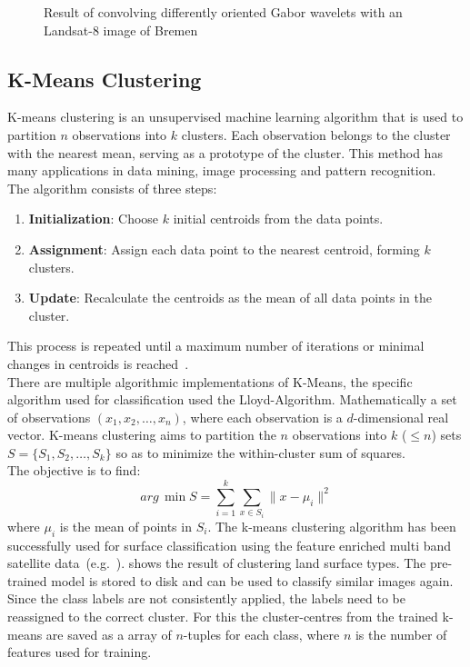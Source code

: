 \documentclass[12pt,a4paper, english,twoside]{scrartcl}
\begin{document}
\begin{figure}[!htbp]
\begin{subfigure}[b]{0.45\textwidth}
           \label{fig:feat06}
       \end{subfigure}
          \caption{Result of convolving differently oriented Gabor wavelets with an Landsat-8 image of Bremen}\label{fig:gaborExample}
      \end{figure}
      \newpage
      \subsection{K-Means Clustering}\label{sec:kmeans}
    K-means clustering is an unsupervised machine learning algorithm that is used to partition $n$ observations into $k$ clusters. 
    Each observation belongs to the cluster with the nearest mean, serving as a prototype of the cluster. 
    This method has many applications in data mining, image processing and pattern recognition.\\
    The algorithm consists of three steps:
    \begin{enumerate}
        \item \textbf{Initialization}: Choose $k$ initial centroids from the data points.
        \item \textbf{Assignment}: Assign each data point to the nearest centroid, forming $k$ clusters.
        \item \textbf{Update}: Recalculate the centroids as the mean of all data points in the cluster. 
    \end{enumerate}
    This process is repeated until a maximum number of iterations or minimal changes in centroids is reached~\autocite{Sinaga2020}.\\ 
    There are multiple algorithmic implementations of K-Means, the specific algorithm used for classification used the Lloyd-Algorithm.
    Mathematically a set of observations $(x_1, x_2, \ldots, x_n)$, where each observation is a $d$-dimensional real vector.
    K-means clustering aims to partition the $n$ observations into $k$ ($\leq n$) sets $S = \{S_1, S_2, \ldots, S_k\}$ so as to minimize the within-cluster sum of squares. \\
    The objective is to find:
    \begin{equation}
        arg\,\min{S} = \sum_{i=1}^{k} \sum_{x \in S_i} \| x - \mu_i \|^2
    \end{equation}
    where $\mu_i$ is the mean of points in $S_i$.
    The k-means clustering algorithm has been successfully used for surface classification using the feature enriched multi band satellite data~(e.g.~\cite{Burrough2000}).
     shows the result of clustering land surface types. 
    The pre-trained model is stored to disk and can be used to classify similar images again. 
    Since the class labels are not consistently applied, the labels need to be reassigned to the correct cluster.
    For this the cluster-centres from the trained k-means are saved as a array of $n$-tuples for each class, where $n$ is the number of features used for training.
    \newpage
\end{document}
